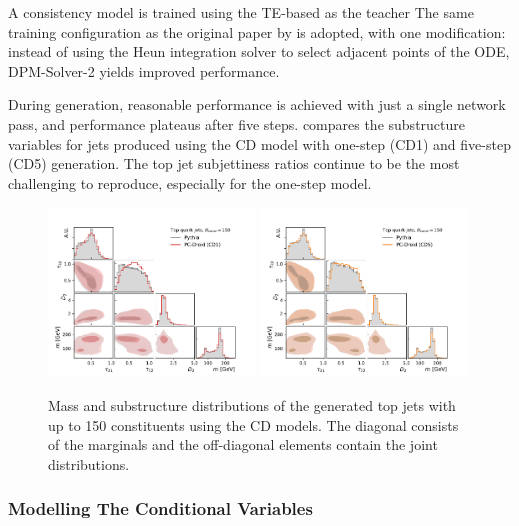 A consistency model is trained using the TE-based \pcdroid as the teacher
The same training configuration as the original paper by \textcite{ConsistencyModels} is adopted, with one modification: instead of using the Heun integration solver to select adjacent points of the ODE, DPM-Solver-2 yields improved performance.

During generation, reasonable performance is achieved with just a single network pass, and performance plateaus after five steps.
 compares the substructure variables for jets produced using the CD model with one-step (CD1) and five-step (CD5) generation.
The top jet subjettiness ratios continue to be the most challenging to reproduce, especially for the one-step model.

\begin{figure}[htpb]
    \centering
    \includegraphics[width=0.49\textwidth]{Figures/jet_generation/droid/150/hlvs/t/100/hlv_corr_PC-DroidCD1.pdf}
    \includegraphics[width=0.49\textwidth]{Figures/jet_generation/droid/150/hlvs/t/100/hlv_corr_PC-DroidCD5.pdf}
    \caption{
        Mass and substructure distributions of the generated top jets with up to 150 constituents using the CD models.
        The diagonal consists of the marginals and the off-diagonal elements contain the joint distributions.
    }
    \label{fig:cd-150}
\end{figure}

\subsubsection{Modelling The Conditional Variables}

